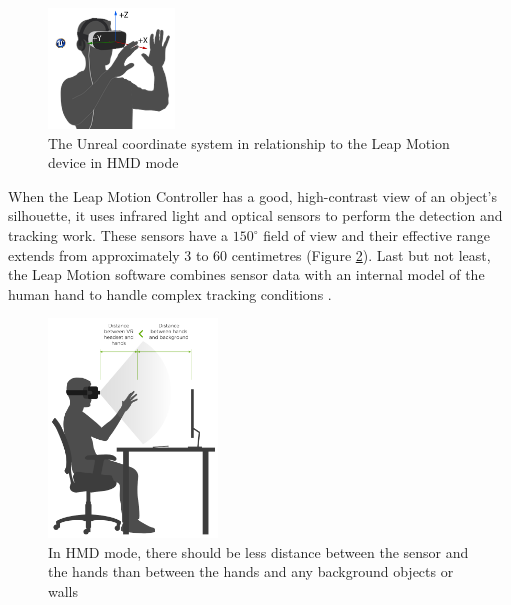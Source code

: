 \begin{figure}[!htb]
\includegraphics[width=0.3\textwidth]{figures/unrealAxes.png}
\centering
\caption{The Unreal coordinate system in relationship to the Leap Motion device in HMD mode}
\label{fig:unrealAxes}
\end{figure}

When the Leap Motion Controller has a good, high-contrast view of an object's silhouette, it uses infrared light and optical sensors to perform the detection and tracking work. These sensors have a $150^\circ$ field of view and their effective range extends from approximately 3 to 60 centimetres (Figure \ref{fig:HMDistance}). Last but not least, the Leap Motion software combines sensor data with an internal model of the human hand to handle complex tracking conditions \cite{ULTP}.

\begin{figure}[!htb]
\includegraphics[width=0.4\textwidth]{figures/HMDistance.png}
\centering
\caption{In HMD mode, there should be less distance between the sensor and the hands than between the hands and any background objects or walls}
\label{fig:HMDistance}
\end{figure}

